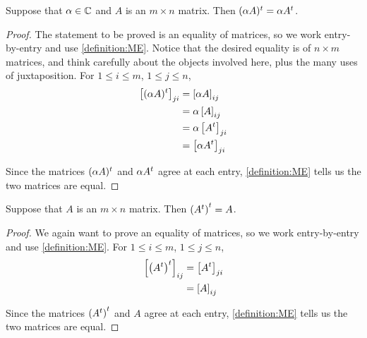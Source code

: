 \documentclass{ximera}
\begin{document}
\begin{theorem}
\label{theorem:TMSM}

Suppose that $\alpha\in\mathbb{C}$ and $A$ is an $m\times n$ matrix.  Then $(\alpha A)^{t}=\alpha A^{t}$.

\begin{proof}
  The statement  to be proved is an equality of matrices, so we work entry-by-entry and use \ref{definition:ME}.  Notice that the desired equality is of $n\times m$ matrices, and think carefully about the objects involved here, plus the many uses of juxtaposition.  For $1\leq i\leq m$, $1\leq j\leq n$,
  \begin{align*}
    \matrixentry{\transpose{(\alpha A)}}{ji}&=
                                              \matrixentry{\alpha A}{ij}\\ %
                                            &=\alpha\matrixentry{A}{ij}\\ %
                                            &=\alpha\matrixentry{\transpose{A}}{ji}\\ %
                                            &=\matrixentry{\alpha\transpose{A}}{ji}\\ %
  \end{align*}

  Since the matrices $(\alpha A)^{t}$ and $\alpha A^{t}$ agree at each entry, \ref{definition:ME} tells us the two matrices are equal.
  
\end{proof}
\end{theorem}

\begin{theorem}
  \label{theorem:TT}
  
  Suppose that $A$ is an $m\times n$ matrix.  Then $\left(A^{t}\right)^{t}=A$.

  \begin{proof}
    We again want to prove an equality of matrices, so we work entry-by-entry and use \ref{definition:ME}.  For $1\leq i\leq m$, $1\leq j\leq n$,
    \begin{align*}
      \matrixentry{\transpose{\left(\transpose{A}\right)}}{ij}
      &=\matrixentry{\transpose{A}}{ji}\\ %
      &=\matrixentry{A}{ij}\\ %
    \end{align*}
    
    Since the matrices $\left(A^{t}\right)^{t}$ and $A$ agree at each entry, \ref{definition:ME} tells us the two matrices are equal.
    
  \end{proof}
\end{theorem}
\end{document}
